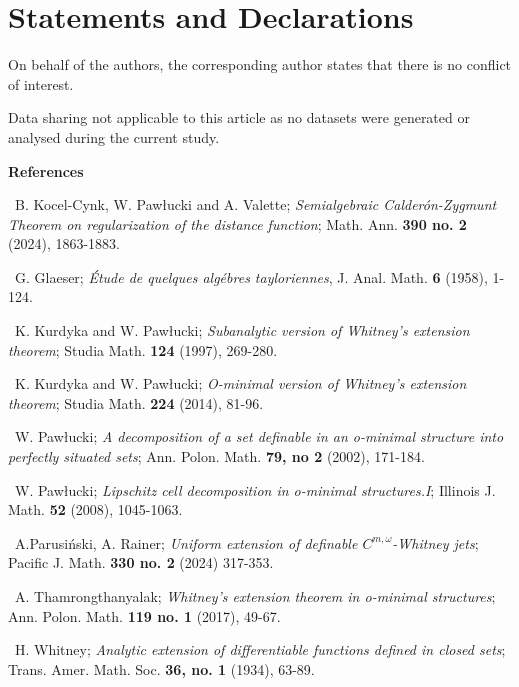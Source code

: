 \documentclass[12pt]{amsart}
\theoremstyle{definition}
\theoremstyle{remark}
\numberwithin{equation}{section}
\begin{document}
\section{Statements and Declarations}

\medskip
On behalf of the authors, the corresponding author states that there is no conflict of interest.

\medskip
Data sharing not applicable to this article as no datasets were generated or analysed during the current study.



\bigskip
\centerline{\bf References}


\bigskip

\medskip
[K-CPV] \, B. Kocel-Cynk, W. Pawłucki and A. Valette; \emph{Semialgebraic Calder{\'o}n-Zygmunt Theorem on regularization of the distance function}; Math. Ann. {\bf 390 no. 2} (2024), 1863-1883.

\medskip
[G] \, G. Glaeser; \emph{{\'E}tude de quelques alg{\'e}bres tayloriennes}, J. Anal. Math. {\bf 6} (1958), 1-124.

\medskip
[KP1] \, K. Kurdyka and W. Pawłucki; \emph{Subanalytic version of Whitney's extension theorem}; Studia Math. {\bf 124} (1997), 269-280.

\medskip
[KP2] \, K. Kurdyka and W. Pawłucki; \emph{O-minimal version of Whitney's extension theorem}; Studia Math. {\bf 224} (2014), 81-96.

\medskip
[P1]  \, W. Pawłucki; \emph{A decomposition of a set definable in an o-minimal structure into perfectly situated sets}; Ann. Polon. Math. {\bf 79, no 2} (2002), 171-184.

\medskip
[P2] \, W. Pawłucki; \emph{Lipschitz cell decomposition in o-minimal structures.I}; Illinois J. Math. {\bf 52} (2008), 1045-1063.

\medskip
[PR] \, A.Parusiński, A. Rainer; \emph{Uniform extension of definable $C^{m,\omega}$-Whitney jets}; Pacific J. Math. {\bf 330 no. 2} (2024) 317-353.

\medskip
[T] \, A. Thamrongthanyalak; \emph{Whitney's extension theorem in o-minimal structures}; Ann. Polon. Math. {\bf 119 no. 1} (2017), 49-67.

\medskip
[W] \, H. Whitney; \emph{Analytic extension of differentiable functions defined in closed sets}; Trans. Amer. Math. Soc. {\bf 36, no. 1} (1934), 63-89.
\end{document}
